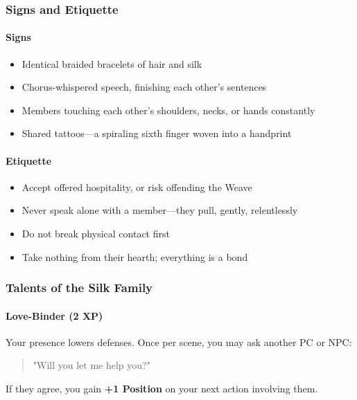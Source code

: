 \documentclass[11pt]{book}
\begin{document}
\subsubsection{Signs and Etiquette}

\paragraph{Signs}
\begin{itemize}[leftmargin=*]
    \item Identical braided bracelets of hair and silk  
    \item Chorus-whispered speech, finishing each other's sentences  
    \item Members touching each other's shoulders, necks, or hands constantly  
    \item Shared tattoos---a spiraling sixth finger woven into a handprint  
\end{itemize}

\paragraph{Etiquette}
\begin{itemize}[leftmargin=*]
    \item Accept offered hospitality, or risk offending the Weave  
    \item Never speak alone with a member---they pull, gently, relentlessly  
    \item Do not break physical contact first  
    \item Take nothing from their hearth; everything is a bond  
\end{itemize}

\subsubsection{Talents of the Silk Family}

\paragraph{Love-Binder (2 XP)}
Your presence lowers defenses.  
Once per scene, you may ask another PC or NPC:
\begin{quote}
    "Will you let me help you?"
\end{quote}
If they agree, you gain \textbf{+1 Position} on your next action involving them.
\end{document}
